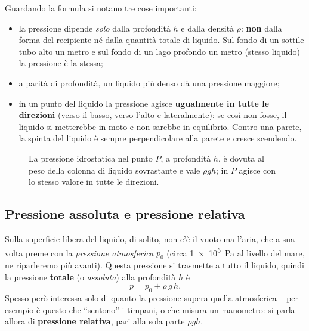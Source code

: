 Guardando la formula si notano tre cose importanti:
\begin{itemize}
    \item la pressione dipende \emph{solo} dalla profondità $h$ e dalla densità $\rho$: \textbf{non} dalla forma del recipiente né dalla quantità totale di liquido. Sul fondo di un sottile tubo alto un metro e sul fondo di un lago profondo un metro (stesso liquido) la pressione è la stessa;
    \item a parità di profondità, un liquido più denso dà una pressione maggiore;
    \item in un punto del liquido la pressione agisce \textbf{ugualmente in tutte le direzioni} (verso il basso, verso l'alto e lateralmente): se così non fosse, il liquido si metterebbe in moto e non sarebbe in equilibrio. Contro una parete, la spinta del liquido è sempre perpendicolare alla parete e cresce scendendo.
\end{itemize}

\begin{figure}[!htbp]
    \centering
    \caption{La pressione idrostatica nel punto $P$, a profondità $h$, è dovuta al peso della colonna di liquido sovrastante e vale $\rho g h$; in $P$ agisce con lo stesso valore in tutte le direzioni.}
    \label{fig:stevino}
\end{figure}

\subsection{Pressione assoluta e pressione relativa}
Sulla superficie libera del liquido, di solito, non c'è il vuoto ma l'aria, che a sua volta preme con la \emph{pressione atmosferica} $p_0$ (circa \SI{1e5}{\pascal} al livello del mare, ne riparleremo più avanti). Questa pressione si trasmette a tutto il liquido, quindi la pressione \textbf{totale} (o \emph{assoluta}) alla profondità $h$ è
\[ p = p_0 + \rho\,g\,h. \]
Spesso però interessa solo di quanto la pressione supera quella atmosferica -- per esempio è questo che ``sentono'' i timpani, o che misura un manometro: si parla allora di \textbf{pressione relativa}, pari alla sola parte $\rho g h$.

